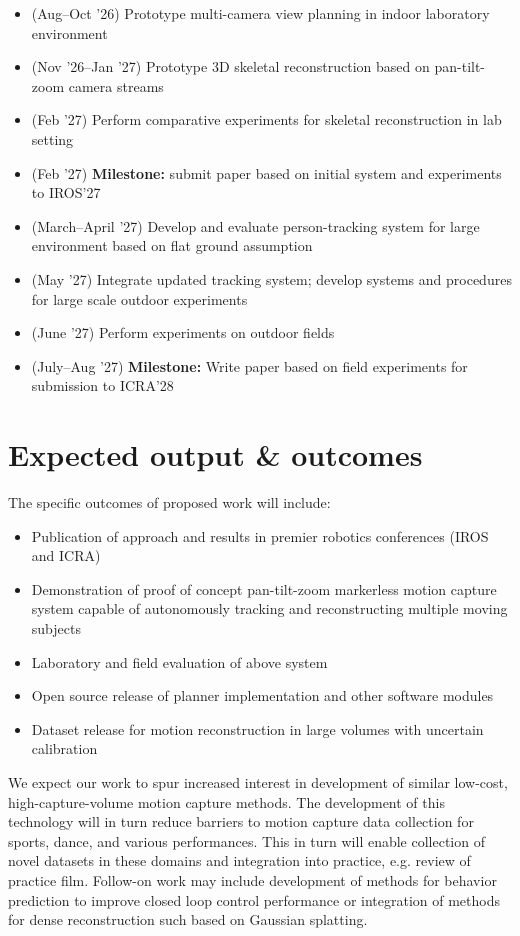 \documentclass[11pt]{article}
\begin{document}
\begin{itemize}
  \item (Aug--Oct '26) Prototype multi-camera view planning in indoor
    laboratory environment
  \item (Nov '26--Jan '27) Prototype 3D skeletal reconstruction based on
    pan-tilt-zoom camera streams
  \item (Feb '27) Perform comparative experiments for skeletal reconstruction in
    lab setting
  \item (Feb '27) \textbf{Milestone:} submit paper based on initial system and
    experiments to IROS'27
  \item (March--April '27) Develop and evaluate person-tracking system for large
    environment based on flat ground assumption
  \item (May '27) Integrate updated tracking system; develop systems and
    procedures for large scale outdoor experiments
  \item (June '27) Perform experiments on outdoor fields
  \item (July--Aug '27) \textbf{Milestone:}
    Write paper based on field experiments for submission to ICRA'28
\end{itemize}

\section{Expected output \& outcomes}

The specific outcomes of proposed work will include:
\begin{itemize}
  \item Publication of approach and results in premier robotics
    conferences (IROS and ICRA)
  \item Demonstration of proof of concept pan-tilt-zoom markerless motion
    capture system capable of autonomously tracking and reconstructing multiple
    moving subjects
  \item Laboratory and field evaluation of above system
  \item Open source release of planner implementation and other software modules
  \item Dataset release for motion reconstruction in large volumes
    with uncertain calibration
\end{itemize}
We expect our work to spur increased interest in development of similar
low-cost, high-capture-volume motion capture methods.
The development of this technology will in turn reduce barriers to motion
capture data collection for sports, dance, and various performances.
This in turn will enable collection of novel datasets in these domains and
integration into practice, e.g. review of practice film.
Follow-on work may include development of methods for behavior prediction to
improve closed loop control performance or integration of methods for dense
reconstruction such based on Gaussian splatting.
\end{document}
